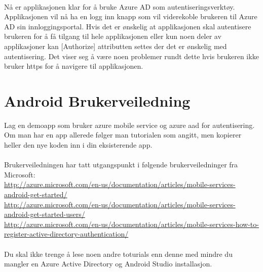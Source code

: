 \\
Nå er applikasjonen klar for å bruke Azure AD som autentiseringsverktøy.
Applikasjonen vil nå ha en logg inn knapp som vil viderekoble brukeren til Azure AD sin innloggingsportal. 
Hvis det er ønskelig at applikasjonen skal autentisere brukeren for å få tilgang til hele applikasjonen eller kun noen deler av applikasjoner kan [Authorize] attributten settes der det er ønskelig med autentisering. Det viser seg å være noen problemer rundt dette hvis brukeren ikke bruker https for å navigere til applikasjonen.
\\

\section{Android Brukerveiledning}
\label{sec:veiledninger_androidBrukerveliedning}
Lag en demoapp som bruker azure mobile service og azure aad for autentisering. Om man har en app allerede følger man tutorialen som angitt, men kopierer heller den nye koden inn i din eksisterende app. 
\\
\\
Brukerveiledningen har tatt utgangspunkt i følgende brukerveiledninger fra Microsoft:
\\\url{http://azure.microsoft.com/en-us/documentation/articles/mobile-services-android-get-started/}
\\\url{http://azure.microsoft.com/en-us/documentation/articles/mobile-services-android-get-started-users/}
\\\url{http://azure.microsoft.com/en-us/documentation/articles/mobile-services-how-to-register-active-directory-authentication/}
\\
\\
Du skal ikke trenge å lese noen andre toturials enn denne med mindre du mangler en Azure Active Directory og Android Studio installasjon.


